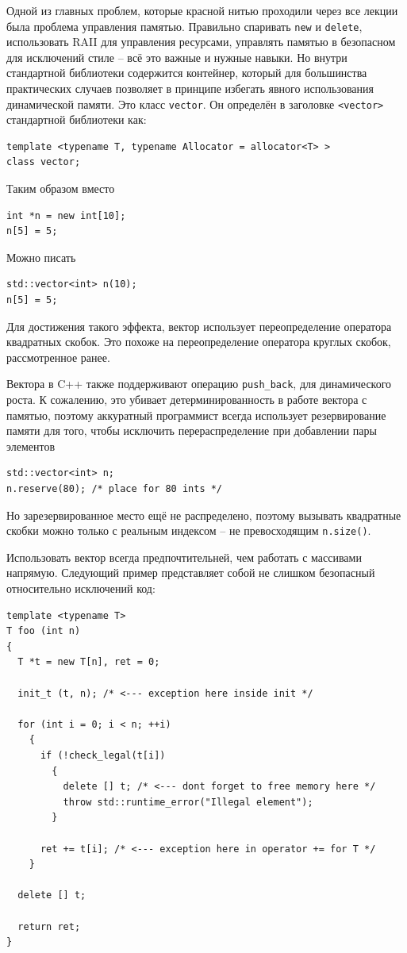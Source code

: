 \documentclass[a4paper,12pt,oneside]{article}
\begin{document}
Одной из главных проблем, которые красной нитью проходили через все лекции была проблема управления памятью. Правильно спаривать \lstinline!new! и \lstinline!delete!, использовать RAII для управления ресурсами, управлять памятью в безопасном для исключений стиле -- всё это важные и нужные навыки. Но внутри стандартной библиотеки содержится контейнер, который для большинства практических случаев позволяет в принципе избегать явного использования динамической памяти. Это класс \lstinline!vector!. Он определён в заголовке \lstinline!<vector>! стандартной библиотеки как:

\begin{lstlisting}
template <typename T, typename Allocator = allocator<T> >
class vector;
\end{lstlisting}

Таким образом вместо

\begin{lstlisting}
int *n = new int[10];
n[5] = 5;
\end{lstlisting}

Можно писать

\begin{lstlisting}
std::vector<int> n(10);
n[5] = 5;
\end{lstlisting}

Для достижения такого эффекта, вектор использует переопределение оператора квадратных скобок. Это похоже на переопределение оператора круглых скобок, рассмотренное ранее.

Вектора в C++ также поддерживают операцию \lstinline!push_back!, для динамического роста. К сожалению, это убивает детерминированность в работе вектора с памятью, поэтому аккуратный программист всегда использует резервирование памяти для того, чтобы исключить перераспределение при добавлении пары элементов

\begin{lstlisting}
std::vector<int> n;
n.reserve(80); /* place for 80 ints */
\end{lstlisting}

Но зарезервированное место ещё не распределено, поэтому вызывать квадратные скобки можно только с реальным индексом -- не превосходящим \lstinline!n.size()!.

Использовать вектор всегда предпочтительней, чем работать с массивами напрямую. Следующий пример представляет собой не слишком безопасный относительно исключений код:

\begin{lstlisting}
template <typename T>
T foo (int n)
{
  T *t = new T[n], ret = 0;

  init_t (t, n); /* <--- exception here inside init */
  
  for (int i = 0; i < n; ++i)
    {
      if (!check_legal(t[i])
        {
          delete [] t; /* <--- dont forget to free memory here */
          throw std::runtime_error("Illegal element");
        }

      ret += t[i]; /* <--- exception here in operator += for T */
    }

  delete [] t;

  return ret;
}
\end{lstlisting}
\end{document}
